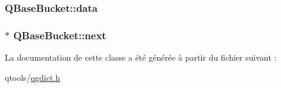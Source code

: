 \subsubsection[{data}]{ Q\+Base\+Bucket\+::data\hspace{0.3cm}{\ttfamily [protected]}}\label{class_q_base_bucket_a3229a7c5fbfb6b1c40953baff31738d6}
\hypertarget{class_q_base_bucket_aa22295c39082152c6cee807a9e19992e}{}
\subsubsection[{next}]{$\ast$ Q\+Base\+Bucket\+::next\hspace{0.3cm}{\ttfamily [protected]}}\label{class_q_base_bucket_aa22295c39082152c6cee807a9e19992e}


La documentation de cette classe a été générée à partir du fichier suivant \+:\begin{DoxyCompactItemize}
\item 
qtools/\hyperlink{qgdict_8h}{qgdict.\+h}\end{DoxyCompactItemize}
